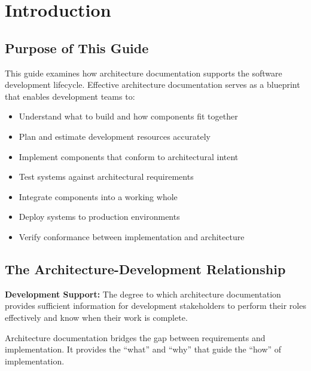 \documentclass[11pt]{article}
\begin{document}
\newpage
\tableofcontents
\newpage

\section{Introduction}

\subsection{Purpose of This Guide}

This guide examines how architecture documentation supports the software development lifecycle. Effective architecture documentation serves as a blueprint that enables development teams to:

\begin{itemize}
    \item Understand what to build and how components fit together
    \item Plan and estimate development resources accurately
    \item Implement components that conform to architectural intent
    \item Test systems against architectural requirements
    \item Integrate components into a working whole
    \item Deploy systems to production environments
    \item Verify conformance between implementation and architecture
\end{itemize}

\subsection{The Architecture-Development Relationship}

\begin{definition}
\textbf{Development Support:} The degree to which architecture documentation provides sufficient information for development stakeholders to perform their roles effectively and know when their work is complete.
\end{definition}

Architecture documentation bridges the gap between requirements and implementation. It provides the ``what'' and ``why'' that guide the ``how'' of implementation.
\end{document}
